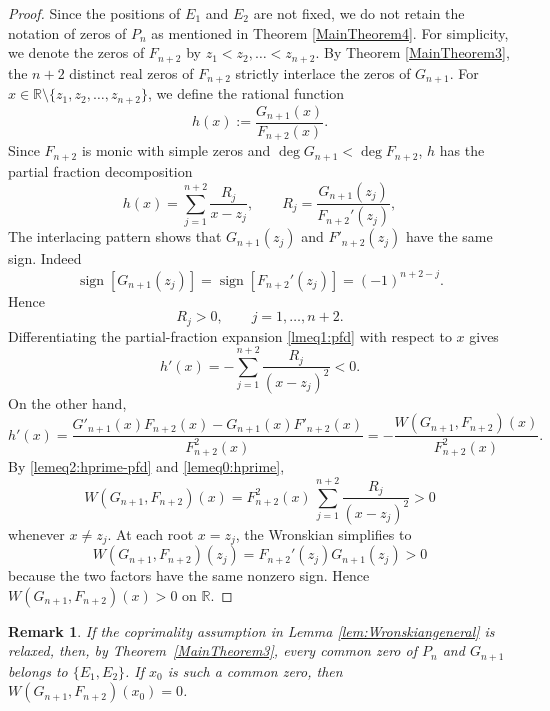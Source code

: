 \documentclass[final,3p,times,12pt]{elsarticle}
\newtheorem{remark}{Remark}[section]
\numberwithin{equation}{section}  %
\begin{document}
\begin{proof} Since the positions of $E_1$ and $E_2$ are not fixed, we do not retain the notation of zeros of $P_n$ as mentioned in Theorem \ref{MainTheorem4}. For simplicity, we denote the zeros of $F_{n+2}$ by $z_1<z_2,\dots<z_{n+2}$. By Theorem \ref{MainTheorem3}, the $n+2$ distinct real zeros of $F_{n+2}$ strictly interlace the zeros of $G_{n+1}$.
	For $x\in\mathbb{R}\setminus \{z_1,z_2,\dots,z_{n+2}\}$, we define the rational function 
	\begin{equation*}
		h(x):=\frac{G_{n+1}(x)}{F_{n+2}(x)}.
	\end{equation*}
		Since $F_{n+2}$ is monic with simple zeros and
	$\deg G_{n+1}<\deg F_{n+2}$, $h$ has the partial fraction decomposition 
	\begin{equation}\label{lmeq1:pfd}
		h(x)=\sum_{j=1}^{n+2}\frac{R_j}{x-z_j},
		\qquad
		R_j=\frac{G_{n+1}(z_j)}{F_{n+2}'(z_j)},
	\end{equation}
    The interlacing pattern shows that $G_{n+1}(z_j)$ and $F'_{n+2}(z_j)$ have the same sign. Indeed \[\operatorname{sign}[G_{n+1}(z_j)]=\operatorname{sign}[F_{n+2}'(z_j)]=(-1)^{n+2-j}.\]  Hence  
	\begin{equation*}%
		R_j>0,\qquad j=1,\ldots,n+2.
	\end{equation*}
	Differentiating the partial-fraction expansion \eqref{lmeq1:pfd} with respect to $x$ gives
	\begin{equation}\label{lemeq2:hprime-pfd}
		h'(x)=-\sum_{j=1}^{n+2}\frac{R_j}{(x-z_j)^2}<0.
	\end{equation} On the other hand,
	\begin{equation}\label{lemeq0:hprime}
		h'(x)=\frac{G'_{n+1}(x)F_{n+2}(x)-G_{n+1}(x)F'_{n+2}(x)}{F_{n+2}^2(x)}
		=-\frac{	W(G_{n+1},F_{n+2})(x)}{F^2_{n+2}(x)}.
	\end{equation}	By \eqref{lemeq2:hprime-pfd} and \eqref{lemeq0:hprime}, \[W(G_{n+1},F_{n+2})(x)=F^2_{n+2}(x)\,\sum_{j=1}^{n+2}\frac{R_j}{(x-z_j)^2} >0\]
	whenever $x\ne z_j$. 	At each root $x = z_j$, the Wronskian simplifies to \[W(G_{n+1},F_{n+2})(z_j) = F_{n+2}'(z_j)G_{n+1}(z_j)>0\] because the two factors have the same nonzero sign. 
	Hence $W(G_{n+1},F_{n+2})(x)>0$ on $\mathbb{R}$.
\end{proof}
\begin{remark} If the coprimality assumption in Lemma \ref{lem:Wronskiangeneral} is relaxed, then, by Theorem~\ref{MainTheorem3}, every common zero of $P_n$ and $G_{n+1}$ belongs to $\{E_1,E_2\}$. If $x_0$ is such a common zero, then  $	W(G_{n+1},F_{n+2})(x_0)=0$.  \end{remark}
\end{document}
